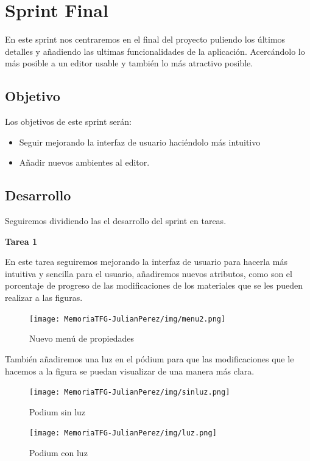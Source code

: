 \documentclass[a4paper, 12pt]{book}
\begin{document}
\section{Sprint Final}
En este sprint nos centraremos en el final del proyecto puliendo los últimos detalles y añadiendo las ultimas funcionalidades de la aplicación. Acercándolo lo más posible a un editor usable y también lo más atractivo posible.

\subsection{Objetivo}
Los objetivos de este sprint serán:
\begin{itemize}
    \item Seguir mejorando la interfaz de usuario haciéndolo más intuitivo
    \item Añadir nuevos ambientes al editor.
\end{itemize}

\subsection{Desarrollo}
Seguiremos dividiendo las el desarrollo del sprint en tareas.

\textbf{Tarea 1}

En este tarea seguiremos mejorando la interfaz de usuario para hacerla más intuitiva y sencilla para el usuario, añadiremos nuevos atributos, como son el porcentaje de progreso de las modificaciones de los materiales que se les pueden realizar a las figuras.

\begin{figure}[H]
  \centering
  \texttt{[image: MemoriaTFG-JulianPerez/img/menu2.png]}
  \caption{Nuevo menú de propiedades}\label{menu2}
\end{figure}

También añadiremos una luz en el pódium para que las modificaciones que le hacemos a la figura se puedan visualizar de una manera más clara.

\begin{figure}[H]
  \centering
  \begin{minipage}[b]{0.4\textwidth}
 \texttt{[image: MemoriaTFG-JulianPerez/img/sinluz.png]}
  \caption{Podium sin luz}\label{single}
  \end{minipage}
  \hfill
  \begin{minipage}[b]{0.4\textwidth}
  \texttt{[image: MemoriaTFG-JulianPerez/img/luz.png]}
  \caption{Podium con luz}\label{scrum}
  \end{minipage}
\end{figure}
\end{document}
